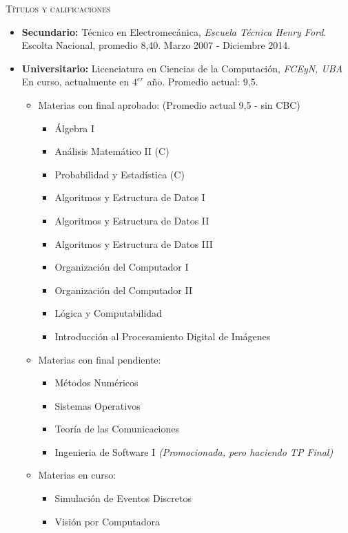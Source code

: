\textsc{Títulos y calificaciones}
\begin{itemize}
    \item \textbf{Secundario:} Técnico en Electromecánica, \textit{Escuela Técnica Henry Ford}.
        Escolta Nacional, promedio 8,40. Marzo 2007 - Diciembre 2014.
    \item \textbf{Universitario:} Licenciatura en Ciencias de la Computación, \textit{FCEyN, UBA} En
        curso, actualmente en $4^{er}$ año. Promedio actual: 9,5.
        \begin{itemize}
            \item Materias con final aprobado: (Promedio actual 9,5 - sin CBC)
                \begin{itemize}
                    \item Álgebra I
                    \item Análisis Matemático II (C)
                    \item Probabilidad y Estadística (C)
                    \item Algoritmos y Estructura de Datos I
                    \item Algoritmos y Estructura de Datos II
                    \item Algoritmos y Estructura de Datos III
                    \item Organización del Computador I
                    \item Organización del Computador II
                    \item Lógica y Computabilidad
                    \item Introducción al Procesamiento Digital de Imágenes
                \end{itemize}
            \item Materias con final pendiente:
                \begin{itemize}
                    \item Métodos Numéricos
                    \item Sistemas Operativos
                    \item Teoría de las Comunicaciones
                    \item Ingenieria de Software I \textit{(Promocionada, pero haciendo TP Final)}
                \end{itemize}
            \item Materias en curso:
                \begin{itemize}
                    \item Simulación de Eventos Discretos
                    \item Visión por Computadora
                \end{itemize}
        \end{itemize}
\end{itemize}

